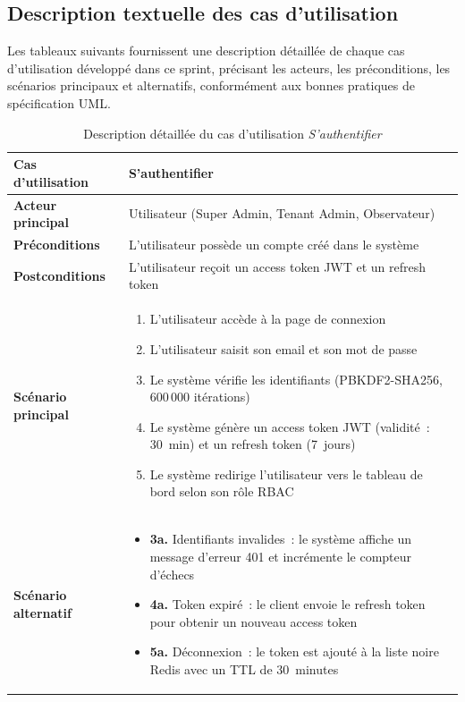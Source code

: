 \subsection{Description textuelle des cas d'utilisation}

Les tableaux suivants fournissent une description détaillée de chaque cas d'utilisation développé dans ce sprint, précisant les acteurs, les préconditions, les scénarios principaux et alternatifs, conformément aux bonnes pratiques de spécification UML.

\begin{table}[H]
\centering
\caption{Description détaillée du cas d'utilisation \textit{S'authentifier}}
\label{tab:uc_desc_auth}
\begin{tabularx}{\textwidth}{|l|X|}
\hline
\textbf{Cas d'utilisation} & S'authentifier \\
\hline
\textbf{Acteur principal} & Utilisateur (Super Admin, Tenant Admin, Observateur) \\
\hline
\textbf{Préconditions} & L'utilisateur possède un compte créé dans le système \\
\hline
\textbf{Postconditions} & L'utilisateur reçoit un access token JWT et un refresh token \\
\hline
\textbf{Scénario principal} & \begin{minipage}[t]{\linewidth}\vspace{2pt}
\begin{enumerate}[noitemsep,topsep=0pt]
\item L'utilisateur accède à la page de connexion
\item L'utilisateur saisit son email et son mot de passe
\item Le système vérifie les identifiants (PBKDF2-SHA256, 600\,000 itérations)
\item Le système génère un access token JWT (validité~: 30~min) et un refresh token (7~jours)
\item Le système redirige l'utilisateur vers le tableau de bord selon son rôle RBAC
\end{enumerate}\vspace{2pt}
\end{minipage} \\
\hline
\textbf{Scénario alternatif} & \begin{minipage}[t]{\linewidth}\vspace{2pt}
\begin{itemize}[noitemsep,topsep=0pt]
\item \textbf{3a.} Identifiants invalides~: le système affiche un message d'erreur 401 et incrémente le compteur d'échecs
\item \textbf{4a.} Token expiré~: le client envoie le refresh token pour obtenir un nouveau access token
\item \textbf{5a.} Déconnexion~: le token est ajouté à la liste noire Redis avec un TTL de 30~minutes
\end{itemize}\vspace{2pt}
\end{minipage} \\
\hline
\end{tabularx}
\end{table}



